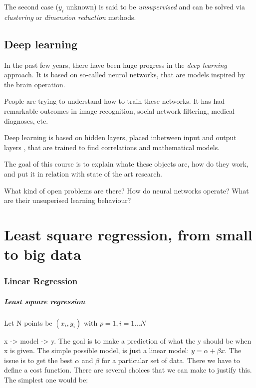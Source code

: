 \documentclass[a4paper]{tufte-book}
\begin{document}
The second case ($y_i$ unknown) is said to be \emph{unsupervised} and can be
solved via \emph{clustering} or \emph{dimension reduction} methods.

\section*{Deep learning}

In the past few years, there have been huge progress in the \emph{deep learning}
approach. It is based on so-called neurol networks, that are models inspired
by the brain operation.

People are trying to understand how to train these networks. It has had
remarkable outcomes in image recognition, social network filtering, medical
diagnoses, etc.

Deep learning is based on hidden layers, placed inbetween input and output layers
, that are trained to find correlations and mathematical models.

The goal of this course is to explain whate these objects are, how do they work,
and put it in relation with state of the art research.

What kind of open problems are there? How do neural networks operate? What are
their unsuperised learning behaviour?


\tableofcontents\thispagestyle{empty}

\mainmatter

\chapter{Least square regression, from small to big data}
\label{ch:least-square}

\subsection{Linear Regression}

\paragraph{Least square regression}

Let N points be $(x_i,y_i)$ with  $p=1, i=1…N$

x -> model -> y. The goal is to make a prediction of what the y should be when x is given.
The simple possible model, is just a linear model: $y=\alpha + \beta x$.
The issue is to get the best $\alpha$ and $\beta$ for a particular set of data.
There we have to define a cost function. There are several choices that we can make to justify this. The simplest one would be:
\end{document}
